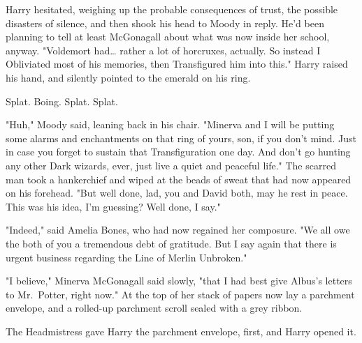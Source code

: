 Harry hesitated, weighing up the probable consequences of trust, the possible
disasters of silence, and then shook his head to Moody in reply. He'd been
planning to tell at least McGonagall about what was now inside her school,
anyway. "Voldemort had{\ldots} rather a lot of horcruxes, actually. So instead
I Obliviated most of his memories, then Transfigured him into this." Harry
raised his hand, and silently pointed to the emerald on his ring.

Splat. Boing. Splat. Splat.

"Huh," Moody said, leaning back in his chair. "Minerva and I will be putting
some alarms and enchantments on that ring of yours, son, if you don't mind.
Just in case you forget to sustain that Transfiguration one day. And don't go
hunting any other Dark wizards, ever, just live a quiet and peaceful life." The
scarred man took a hankerchief and wiped at the beads of sweat that had now
appeared on his forehead. "But well done, lad, you and David both, may he rest
in peace. This was his idea, I'm guessing? Well done, I say."

"Indeed," said Amelia Bones, who had now regained her composure. "We all owe
the both of you a tremendous debt of gratitude. But I say again that there is
urgent business regarding the Line of Merlin Unbroken."

"I believe," Minerva McGonagall said slowly, "that I had best give Albus's
letters to Mr.~Potter, right now." At the top of her stack of papers now lay a
parchment envelope, and a rolled-up parchment scroll sealed with a grey ribbon.

The Headmistress gave Harry the parchment envelope, first, and Harry opened it.
\sbreak

